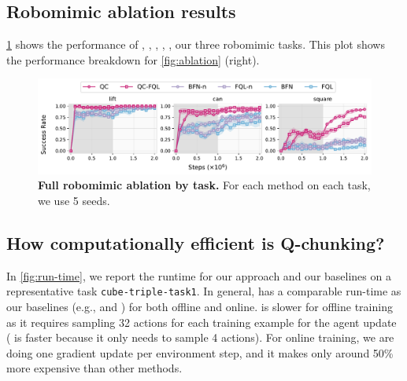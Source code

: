 \subsection{Robomimic ablation results}
\cref{fig:full-robomimic} shows the performance of , , , , ,  our three robomimic tasks. This plot shows the performance breakdown for \cref{fig:ablation} (right). 
\begin{figure}[H]
    \centering
\includegraphics[width=\linewidth]{figures/robomimic-all.pdf}  %
    \caption{\textbf{Full robomimic ablation by task.} For each method on each task, we use 5 seeds.}
    \label{fig:full-robomimic}
\end{figure}

\subsection{How computationally efficient is Q-chunking?}
In \cref{fig:run-time}, we report the runtime for our approach and our baselines on a representative task \texttt{cube-triple-task1}. In general,  has a comparable run-time as our baselines (e.g.,  and ) for both offline and online.  is slower for offline training as it requires sampling 32 actions for each training example for the agent update ( is faster because it only needs to sample 4 actions). For online training, we are doing one gradient update per environment step, and it makes  only around 50\% more expensive than other methods.

